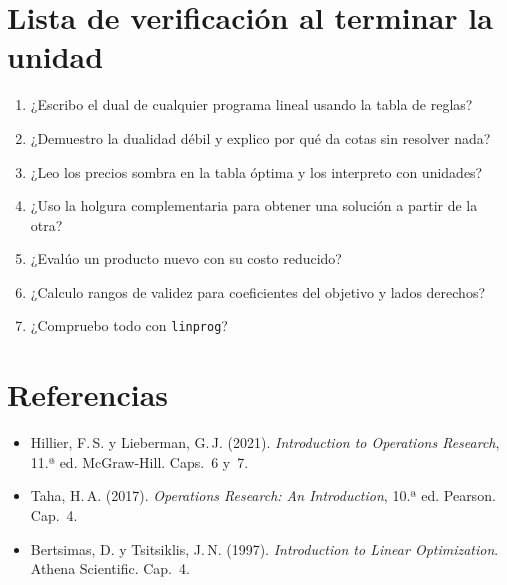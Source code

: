 \documentclass[a4paper,11pt]{article}
\theoremstyle{plain}
\theoremstyle{definition}
\begin{document}
\section*{Lista de verificación al terminar la unidad}
\begin{enumerate}
\item ¿Escribo el dual de cualquier programa lineal usando la tabla de reglas?
\item ¿Demuestro la dualidad débil y explico por qué da cotas sin resolver nada?
\item ¿Leo los precios sombra en la tabla óptima y los interpreto con unidades?
\item ¿Uso la holgura complementaria para obtener una solución a partir de la otra?
\item ¿Evalúo un producto nuevo con su costo reducido?
\item ¿Calculo rangos de validez para coeficientes del objetivo y lados derechos?
\item ¿Compruebo todo con \texttt{linprog}?
\end{enumerate}

\section*{Referencias}
\begin{itemize}
\item Hillier, F.\,S. y Lieberman, G.\,J. (2021). \emph{Introduction to Operations Research}, 11.ª ed. McGraw-Hill. Caps.~6 y~7.
\item Taha, H.\,A. (2017). \emph{Operations Research: An Introduction}, 10.ª ed. Pearson. Cap.~4.
\item Bertsimas, D. y Tsitsiklis, J.\,N. (1997). \emph{Introduction to Linear Optimization}. Athena Scientific. Cap.~4.
\end{itemize}
\end{document}

